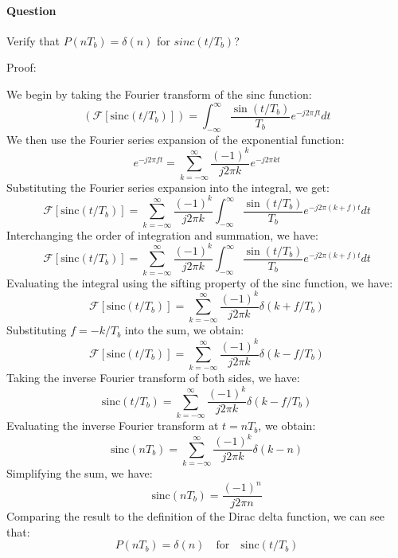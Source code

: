 \documentclass[14pt,a4paper]{report}
\newcounter{question}
\newcommand*\question{%
\stepcounter{question}%
\paragraph{Question \thequestion}}
\begin{document}
\question 
{
    Verify that $P (nT_b ) = \delta (n)$ for $sinc(t/T_b )$?
}
\begin{answer_box*}
Proof:

We begin by taking the Fourier transform of the sinc function:
\begin{equation}
\left(\mathcal{F}[\text{sinc}(t/T_b)]\right) = \int_{-\infty}^{\infty} \frac{\sin(t/T_b)}{T_b} e^{-j2\pi ft} dt
\end{equation}
We then use the Fourier series expansion of the exponential function:
\begin{equation}
e^{-j2\pi ft} = \sum_{k=-\infty}^{\infty} \frac{(-1)^k}{j2\pi k} e^{-j2\pi kt}
\end{equation}
Substituting the Fourier series expansion into the integral, we get:
\begin{equation}
\mathcal{F}[\text{sinc}(t/T_b)] = \sum_{k=-\infty}^{\infty} \frac{(-1)^k}{j2\pi k} \int_{-\infty}^{\infty} \frac{\sin(t/T_b)}{T_b} e^{-j2\pi (k+f)t} dt
\end{equation}
Interchanging the order of integration and summation, we have:
\begin{equation}
\mathcal{F}[\text{sinc}(t/T_b)] = \sum_{k=-\infty}^{\infty} \frac{(-1)^k}{j2\pi k} \int_{-\infty}^{\infty} \frac{\sin(t/T_b)}{T_b} e^{-j2\pi (k+f)t} dt
\end{equation}
Evaluating the integral using the sifting property of the sinc function, we have:
\begin{equation}
\mathcal{F}[\text{sinc}(t/T_b)] = \sum_{k=-\infty}^{\infty} \frac{(-1)^k}{j2\pi k} \delta(k+f/T_b)
\end{equation}
Substituting $f = -k/T_b$ into the sum, we obtain:
\begin{equation}
\mathcal{F}[\text{sinc}(t/T_b)] = \sum_{k=-\infty}^{\infty} \frac{(-1)^k}{j2\pi k} \delta(k-f/T_b)
\end{equation}
Taking the inverse Fourier transform of both sides, we have:
\begin{equation}
\text{sinc}(t/T_b) = \sum_{k=-\infty}^{\infty} \frac{(-1)^k}{j2\pi k} \delta(k-f/T_b)
\end{equation}
Evaluating the inverse Fourier transform at $t = nT_b$, we obtain:
\begin{equation}
\text{sinc}(nT_b) = \sum_{k=-\infty}^{\infty} \frac{(-1)^k}{j2\pi k} \delta(k-n)
\end{equation}
Simplifying the sum, we have:
\begin{equation}
\text{sinc}(nT_b) = \frac{(-1)^n}{j2\pi n}
\end{equation}
Comparing the result to the definition of the Dirac delta function, we can see that:
\begin{equation}
P(nT_b) = \delta(n) \quad \text{for} \quad \text{sinc}(t/T_b)
\end{equation}
\end{answer_box*}
\end{document}

